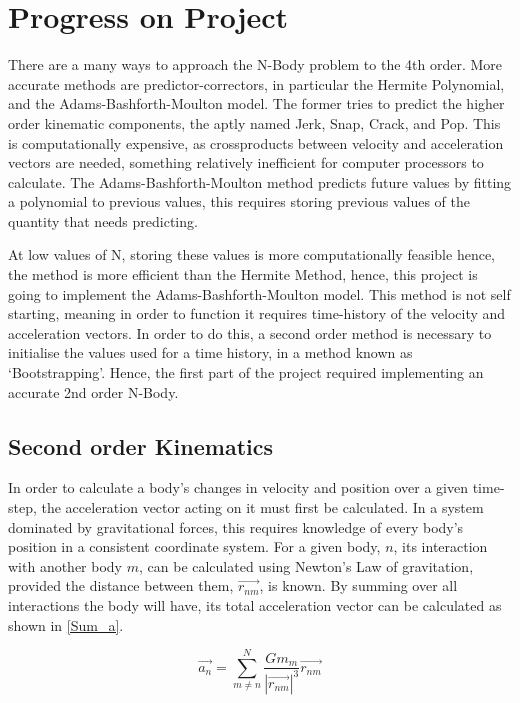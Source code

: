 \documentclass[a4paper,10pt]{article}
\begin{document}
\section{Progress on Project}

There are a many ways to approach the N-Body problem to the 4th order. More accurate methods are predictor-correctors, in particular the Hermite Polynomial, and the Adams-Bashforth-Moulton model. The former tries to predict the higher order kinematic components, the aptly named Jerk, Snap, Crack, and Pop. This is computationally expensive, as crossproducts between velocity and acceleration vectors are needed, something relatively inefficient for computer processors to calculate. The Adams-Bashforth-Moulton method predicts future values by fitting a polynomial to previous values, this requires storing previous values of the quantity that needs predicting. 

At low values of N, storing these values is more computationally feasible hence, the method is more efficient than the Hermite Method, hence, this project is going to implement the Adams-Bashforth-Moulton model. This method is not self starting, meaning in order to function it requires time-history of the velocity and acceleration vectors. In order to do this, a second order method is necessary to initialise the values used for a time history, in a method known as `Bootstrapping'. Hence, the first part of the project required implementing an accurate 2nd order N-Body. 

\subsection{Second order Kinematics}

In order to calculate a body's changes in velocity and position over a given time-step, the acceleration vector acting on it must first be calculated. In a system dominated by gravitational forces, this requires knowledge of every body's position in a consistent coordinate system. For a given body, $n$, its interaction with another body $m$, can be calculated using Newton's Law of gravitation, provided the distance between them, $\vec{r_{nm}}$, is known. By summing over all interactions the body will have, its total acceleration vector can be calculated as shown in \cref{Sum_a}.

\begin{equation} \label{Sum_a}
    \vec{a_n} =  \sum\limits_{m\neq n}^{N} \frac{G m_m}{\left|\vec{r_{nm}}\right|^3}\vec{r_{nm}}
\end{equation}
\end{document}
